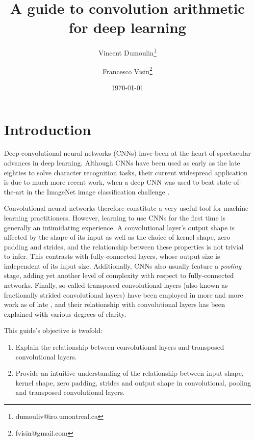 \documentclass{report}
\title{A guide to convolution arithmetic for deep learning}
\author[*]{Vincent Dumoulin\thanks{dumouliv@iro.umontreal.ca}}
\author[*]{Francesco Visin\thanks{fvisin@gmail.com}}
\affil[*]{MILA, Universit\'{e} de Montr\'{e}al}
\date{\today}
\begin{document}
\maketitle

\chapter{Introduction}

Deep convolutional neural networks (CNNs) have been at the heart of spectacular
advances in deep learning. Although CNNs have been used as early as the late
eighties \citep{lecun1989generalization} to solve character recognition
tasks, their current widespread application is due to much more recent work,
when a deep CNN was used to beat state-of-the-art in the ImageNet image
classification challenge \citep{krizhevsky2012imagenet}.

Convolutional neural networks therefore constitute a very useful tool for
machine learning practitioners. However, learning to use CNNs for the first time
is generally an intimidating experience. A convolutional layer's output shape is
affected by the shape of its input as well as the choice of kernel shape, zero
padding and strides, and the relationship between these properties is not
trivial to infer. This contrasts with fully-connected layers, whose output size
is independent of its input size. Additionally, CNNs also usually feature a {\em
pooling} stage, adding yet another level of complexity with respect to
fully-connected networks.  Finally, so-called transposed convolutional layers
(also known as fractionally strided convolutional layers) have been employed in
more and more work as of late
\citep{zeiler2011adaptive,zeiler2014visualizing,long2015fully,radford2015unsupervised,im2016generating},
and their relationship with convolutional layers has been explained with various
degrees of clarity.

This guide's objective is twofold:

\begin{enumerate}
    \item Explain the relationship between convolutional layers and transposed
        convolutional layers.
    \item Provide an intuitive understanding of the relationship between input
        shape, kernel shape, zero padding, strides and output shape in
        convolutional, pooling and transposed convolutional layers.
\end{enumerate}
\end{document}
